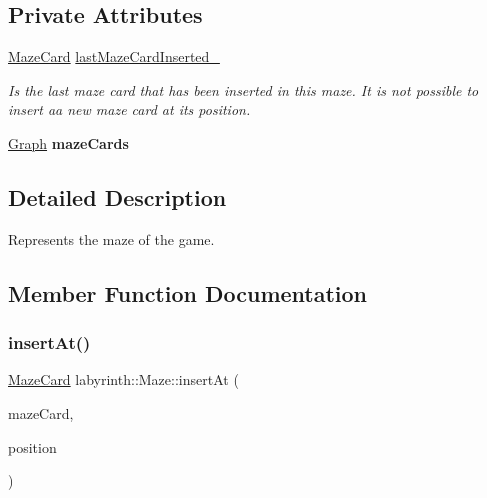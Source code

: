 \subsection*{Private Attributes}
\begin{DoxyCompactItemize}
\item 
\mbox{\label{classlabyrinth_1_1_maze_ac8b72f92ca74081f277382466011fbcb}} 
\mbox{\hyperlink{structlabyrinth_1_1_maze_card}{Maze\+Card}} \mbox{\hyperlink{classlabyrinth_1_1_maze_ac8b72f92ca74081f277382466011fbcb}{last\+Maze\+Card\+Inserted\+\_\+}}
\begin{DoxyCompactList}\small\item\em Is the last maze card that has been inserted in this maze. It is not possible to insert aa new maze card at its position. \end{DoxyCompactList}\item 
\mbox{\label{classlabyrinth_1_1_maze_a1a3e3848e92c849678cec59140c4ec6e}} 
\mbox{\hyperlink{classlabyrinth_1_1_maze_abb3bbbb15f15c845c59f63bff641d581}{Graph}} {\bfseries maze\+Cards}
\end{DoxyCompactItemize}


\subsection{Detailed Description}
Represents the maze of the game. 

\subsection{Member Function Documentation}
\mbox{\label{classlabyrinth_1_1_maze_a7160382f63fb23ae739a34ba6dcec303}} 
\subsubsection{\texorpdfstring{insertAt()}{insertAt()}}
{\footnotesize\ttfamily \mbox{\hyperlink{structlabyrinth_1_1_maze_card}{Maze\+Card}} labyrinth\+::\+Maze\+::insert\+At (\begin{DoxyParamCaption}\item[{const \mbox{\hyperlink{structlabyrinth_1_1_maze_card}{Maze\+Card}} \&}]{maze\+Card,  }\item[{Maze\+Position}]{position }\end{DoxyParamCaption})}



